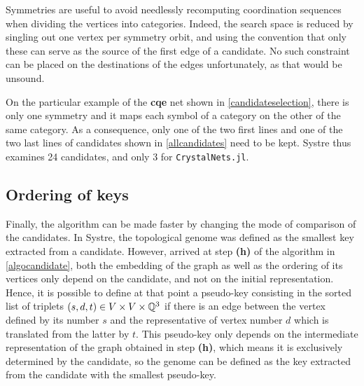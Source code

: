 \documentclass[main.tex]{subfiles}
\begin{document}
Symmetries are useful to avoid needlessly recomputing coordination sequences when dividing the vertices into categories. Indeed, the search space is reduced by singling out one vertex per symmetry orbit, and using the convention that only these can serve as the source of the first edge of a candidate. No such constraint can be placed on the destinations of the edges unfortunately, as that would be unsound.

On the particular example of the \textbf{cqe} net shown in \cref{candidateselection}, there is only one symmetry and it maps each symbol of a category on the other of the same category. As a consequence, only one of the two first lines and one of the two last lines of candidates shown in \cref{allcandidates} need to be kept. Systre thus examines 24 candidates, and only 3 for \texttt{CrystalNets.jl}.



\subsection{Ordering of keys}

Finally, the algorithm can be made faster by changing the mode of comparison of the candidates. In Systre, the topological genome was defined as the smallest key extracted from a candidate. However, arrived at step {\bf (h)} of the algorithm in \cref{algocandidate}, both the embedding of the graph as well as the ordering of its vertices only depend on the candidate, and not on the initial representation. Hence, it is possible to define at that point a pseudo-key consisting in the sorted list of triplets $(s, d, t)\in V\times V\times\mathbb{Q}^3$ if there is an edge between the vertex defined by its number $s$ and the representative of vertex number $d$ which is translated from the latter by $t$. This pseudo-key only depends on the intermediate representation of the graph obtained in step {\bf (h)}, which means it is exclusively determined by the candidate, so the genome can be defined as the key extracted from the candidate with the smallest pseudo-key.
\end{document}
